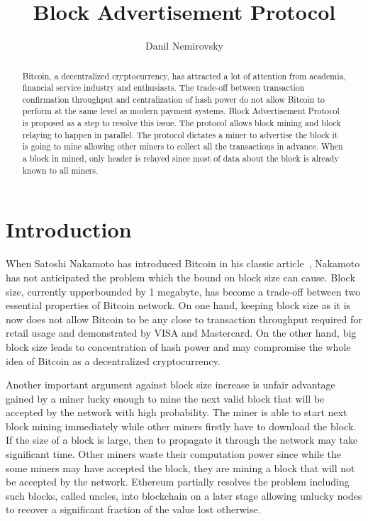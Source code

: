 \documentclass[12pt]{elsarticle}
\begin{document}
\sloppy

\begin{frontmatter}

\title{Block Advertisement Protocol}

\author{Danil Nemirovsky}

\address{danil.nemirovsky@gmail.com}

\begin{abstract}
Bitcoin, a decentralized cryptocurrency, has attracted a lot of attention from academia, financial service industry and enthusiasts. The trade-off between transaction confirmation throughput and centralization of hash power do not allow Bitcoin to perform at the same level as modern payment systems. Block Advertisement Protocol is proposed as a step to resolve this issue. The protocol allows block mining and block relaying to happen in parallel. The protocol dictates a miner to advertise the block it is going to mine allowing other miners to collect all the transactions in advance. When a block in mined, only header is relayed since most of data about the block is already known to all miners.
\end{abstract}

\end{frontmatter}

\section{Introduction}

When Satoshi Nakamoto has introduced Bitcoin in his classic article~\cite{nakamoto2009bitcoin}, Nakamoto has not anticipated the problem which the bound on block size can cause. Block size, currently upperbounded by 1 megabyte, has become a trade-off between two essential properties of Bitcoin network. On one hand, keeping block size as it is now does not allow Bitcoin to be any close to transaction throughput required for retail usage and demonstrated by VISA and Mastercard. On the other hand, big block size leads to concentration of hash power and may compromise the whole idea of Bitcoin as a decentralized cryptocurrency. 

Another important argument against block size increase is unfair advantage gained by a miner lucky enough to mine the next valid block that will be accepted by the network with high probability. The miner is able to start next block mining immediately while other miners firstly have to download the block. If the size of a block is large, then to propagate it through the network may take significant time. Other miners waste their computation power since while the some miners may have accepted the block, they are mining a block that will not be accepted by the network. Ethereum partially resolves the problem including such blocks, called uncles, into blockchain on a later stage allowing unlucky nodes to recover a significant fraction of the value lost otherwise.
\end{document}
